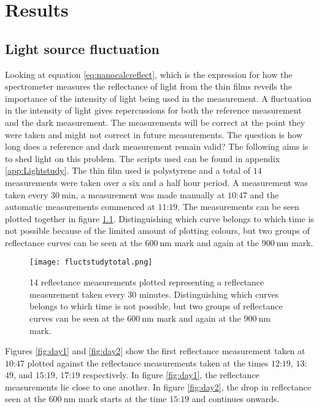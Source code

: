 \documentclass[MasterThesisMain.tex]{subfiles}
\begin{document}
\chapter{Results} \label{ch:results}

\section{Light source fluctuation}
Looking at equation \ref{eq:nanocalcreflect}, which is the expression for how the spectrometer measures the reflectance of light from the thin films reveils the importance of the intensity of light being used in the measurement. A fluctuation in the intensity of light gives repercussions for both the reference measurement and the dark measurement. The measurements will be correct at the point they were taken and might not correct in future measurements. The question is how long does a reference and dark measurement remain valid? The following aims is to shed light on this problem. The scripts used can be found in appendix \ref{app:Lightstudy}. The thin film used is polystyrene and a total of $14$ measurements were taken over a six and a half hour period. A measurement was taken every $\SI{30}{\minute}$, a measurement was made manually at $10$:$47$ and the automatic measurements commenced at $11$:$19$. The measurements can be seen plotted together in figure \ref{fig:daytotal}. Distinguishing which curve belongs to which time is not possible because of the limited amount of plotting colours, but two groups of reflectance curves can be seen at the $\SI{600}{\nano\meter}$ mark and again at the $\SI{900}{\nano\meter}$ mark.
  
\begin{figure}
\centering
\texttt{[image: fluctstudytotal.png]}
\caption{14 reflectance measurements plotted representing a reflectance measurement taken every $30$ minutes. Distinguishing which curves belongs to which time is not possible, but two groups of reflectance curves can be seen at the $\SI{600}{\nano\meter}$ mark and again at the $\SI{900}{\nano\meter}$ mark.}
\label{fig:daytotal}
\end{figure}

Figures \ref{fig:day1} and \ref{fig:day2} show the first reflectance measurement taken at $10$:$47$ plotted against the reflectance measurements taken at the times $12$:$19$, $13$:$49$, and $15$:$19$, $17$:$19$ respectively. In figure \ref{fig:day1}, the reflectance measurements lie close to one another. In figure \ref{fig:day2}, the drop in reflectance seen at the $\SI{600}{\nano\meter}$ mark starts at the time $15$:$19$ and continues onwards. 
\end{document}

